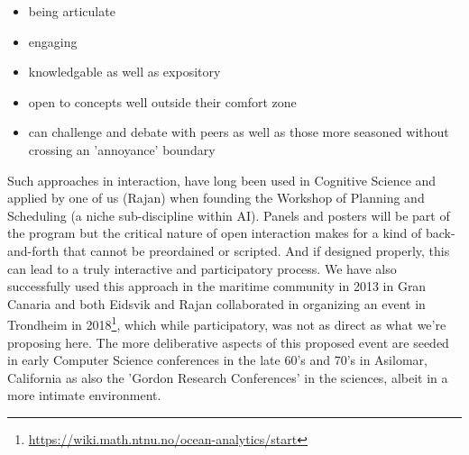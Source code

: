 \begin{itemize}
  \begin{itemize}

  \item being articulate
  \item engaging
  \item knowledgable as well as expository
  \item open to concepts well outside their comfort zone
  \item can challenge and debate with peers as well as those more
    seasoned without crossing an 'annoyance' boundary

  \end{itemize}

\end{itemize}  

\noindent
Such approaches in interaction, have long been used in Cognitive
Science and applied by one of us (Rajan) when founding the \nas
Workshop of Planning and Scheduling (a niche sub-discipline within
AI). Panels and posters will be part of the program but the critical
nature of open interaction makes for a kind of back-and-forth that
cannot be preordained or scripted. And if designed properly, this can
lead to a truly interactive and participatory process. We have also
successfully used this approach in the maritime community in 2013 in
Gran Canaria and both Eidsvik and Rajan collaborated in organizing an
event in Trondheim in
2018\footnote{\url{https://wiki.math.ntnu.no/ocean-analytics/start}},
which while participatory, was not as direct as what we're proposing
here. The more deliberative aspects of this proposed event are seeded
in early Computer Science conferences in the late 60's and 70's in
Asilomar, California as also the 'Gordon Research Conferences' in the
sciences, albeit in a more intimate environment.

